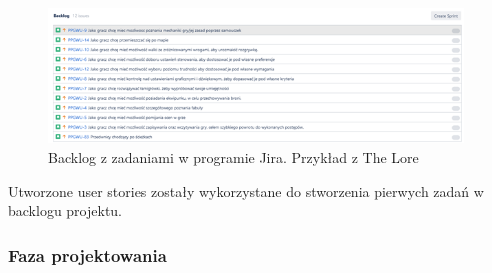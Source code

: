 \documentclass[oneside,polski,logo]{amuthesis}
\begin{document}
\begin{figure}[h]
	\centering
	\includegraphics[width=11cm]{images/hyps/backlog.png}
	\caption{Backlog z zadaniami w programie Jira. Przykład z The Lore}
\end{figure}

Utworzone user stories zostały wykorzystane do stworzenia pierwych zadań w backlogu projektu.\\ 

\subsubsection{Faza projektowania}
\end{document}
